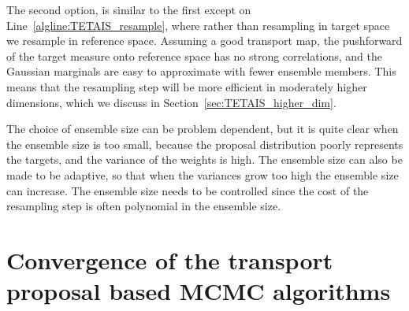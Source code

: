 \documentclass[final]{siamltex}
\newcommand{\edit}[1]{#1}
\begin{document}
The second option, is similar to
the first except on Line~\ref{algline:TETAIS_resample}, where rather
than resampling in target space we resample in reference
space. Assuming a good transport map, the pushforward of the target
measure onto 
reference space has no strong correlations, and the
Gaussian marginals are easy to approximate with fewer ensemble
members. This means that the resampling step will be more efficient in
moderately higher dimensions, which we discuss in
Section~\ref{sec:TETAIS_higher_dim}.

\edit{The choice of ensemble size can be problem dependent, but it is quite clear when the ensemble size is
  too small, because the proposal distribution poorly represents the
  targets, and the variance of the weights is high. The ensemble size
  can also be made to be adaptive, so that when the variances grow too
high the ensemble size can increase. The ensemble size needs to be
controlled since the cost of the resampling step is often polynomial
in the ensemble size.}

\section[Convergence of transport MCMC]{Convergence of the transport proposal based MCMC algorithms}\label{sec:conv}
\end{document}

